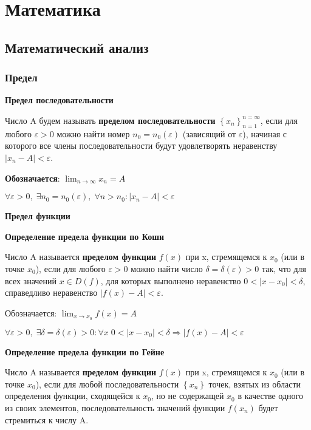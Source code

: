 \documentclass[12pt]{matmex-diploma}
\begin{document}
\tableofcontents

\section{Математика} 


    \subsection{Математический анализ}

        \subsubsection*{Предел}
        
            \textbf{Предел последовательности}
            
            Число A будем называть \textbf{пределом последовательности} $\left\{ x_n \right\}_{n=1}^{n=\infty}$, если для любого $\varepsilon>0$ можно найти номер $n_0 = n_0\left( \varepsilon \right)$ (зависящий от $\varepsilon$), начиная с которого все члены последовательности будут удовлетворять неравенству $|x_n - A|<\varepsilon$.
            
            \textbf{Обозначается}: $\lim_{n \to \infty}x_n = A$
            
            $\forall \varepsilon>0, \; \exists n_0 = n_0(\varepsilon) , \; \forall n > n_0: |x_n - A|<\varepsilon$
            
            \textbf{Предел функции}
            
            \textbf{Определение предела функции по Коши}
            
            Число A называется \textbf{пределом функции} $f(x)$ при x, стремящемся к $x_0$ (или в точке $x_0$), если для любого $\varepsilon>0$ можно найти число $\delta=\delta(\varepsilon)>0$ так, что для всех значений $x \in D(f)$, для которых выполнено неравенство $0<|x - x_0|<\delta$, справедливо неравенство $|f(x) - A|<\varepsilon$.
            
            Обозначается: $\lim_{x \to x_0}f(x) = A$
            
            $\forall \varepsilon>0, \; \exists \delta=\delta(\varepsilon)>0 : \forall x \;  0<|x - x_0|<\delta \Rightarrow |f(x) - A| < \varepsilon$
            
            \textbf{Определение предела функции по Гейне}
            
            Число A называется \textbf{пределом функции} $f(x)$ при x, стремящемся к $x_0$ (или в точке $x_0$), если для любой последовательности $\left\{ x_n \right\}$ точек, взятых из области определения функции, сходящейся к $x_0$, но не содержащей $x_0$ в качестве одного из своих элементов, последовательность значений функции $f(x_n)$ будет стремиться к числу A.
            
\end{document}
